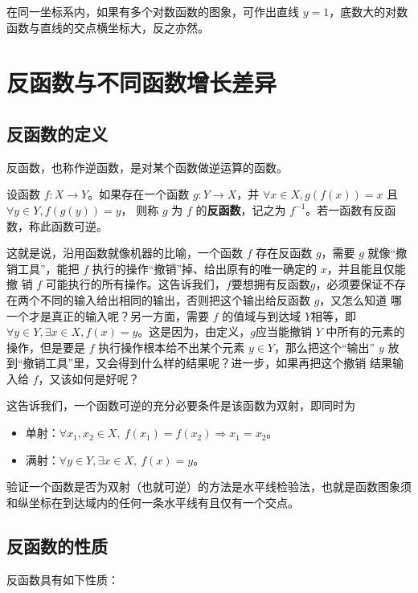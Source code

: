 \documentclass[a4paper,openany]{ctexbook}
\begin{document}
在同一坐标系内，如果有多个对数函数的图象，可作出直线 \(y=1\)，底数大的对数函数与直线的交点横坐标大，反之亦然。

\section{反函数与不同函数增长差异}

\subsection{反函数的定义}

反函数，也称作逆函数，是对某个函数做逆运算的函数。

设函数 \(f:X\to Y\)。如果存在一个函数 \(g:Y\to X\)，并 \(\forall x \in X,g(f(x))=x\) 且 \(\forall y\in Y,f(g(y))=y\)，
则称 \(g\) 为 \(f\) 的\textbf{反函数}，记之为 \(f^{-1}\)。若一函数有反函数，称此函数可逆。

这就是说，沿用函数就像机器的比喻，一个函数 \(f\) 存在反函数 \(g\)，需要 \(g\) 就像“撤销工具”，能把 \(f\) 执行的操作“撤销”掉、给出原有的唯一确定的 \(x\)，并且能且仅能撤
销 \(f\) 可能执行的所有操作。这告诉我们，\(f\)要想拥有反函数\(g\)，必须要保证不存在两个不同的输入给出相同的输出，否则把这个输出给反函数 \(g\)，又怎么知道
哪一个才是真正的输入呢？另一方面，需要 \(f\) 的值域与到达域 \(Y\)相等，即 \(\forall y \in Y,\exists x\in X, f(x)=y\)。这是因为，由定义，\(g\)应当能撤销 \(Y\)
中所有的元素的操作，但是要是 \(f\) 执行操作根本给不出某个元素 \(y\in Y\)，那么把这个“输出” \(y\) 放到“撤销工具”里，又会得到什么样的结果呢？进一步，如果再把这个撤销
结果输入给 \(f\)，又该如何是好呢？

这告诉我们，一个函数可逆的充分必要条件是该函数为双射，即同时为

\begin{itemize}
    \item 单射：\(\forall x_1,x_2\in X,\ f(x_1)=f(x_2)\Rightarrow x_1=x_2\)。
    \item 满射：\(\forall y\in Y,\exists x\in X, \ f(x)=y\)。
\end{itemize}

验证一个函数是否为双射（也就可逆）的方法是水平线检验法，也就是函数图象须和纵坐标在到达域内的任何一条水平线有且仅有一个交点。

\subsection{反函数的性质}

反函数具有如下性质：
\end{document}
